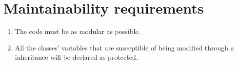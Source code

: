 \documentclass{article}
\makeatletter
\def\threedigits#1{\expandafter\@threedigits\csname c@#1\endcsname}
\def\@threedigits#1{%
  \ifnum#1<100 0\fi
  \ifnum#1<10 0\fi
  \number#1}
\makeatother
\begin{document}
\section{Maintainability requirements}
\begin{enumerate}[label=\textbf{MR\threedigits*}]
	\item The code must be as modular as possible. 
	\item All the classes' variables that are susceptible of being modified through a inheritance will be declared as protected. 
	
\end{enumerate}


\end{document}
